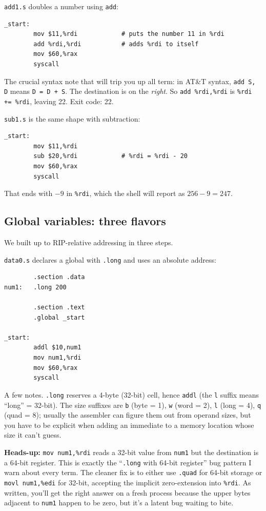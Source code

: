 \documentclass[11pt]{article}
\begin{document}
\texttt{add1.s} doubles a number using \texttt{add}:

\begin{lstlisting}
_start:
        mov $11,%rdi            # puts the number 11 in %rdi
        add %rdi,%rdi           # adds %rdi to itself
        mov $60,%rax
        syscall
\end{lstlisting}

The crucial syntax note that will trip you up all term: in AT\&T
syntax, \texttt{add S, D} means \texttt{D = D + S}. The destination is
on the \emph{right}. So \texttt{add \%rdi,\%rdi} is \texttt{\%rdi +=
\%rdi}, leaving 22. Exit code: 22.

\texttt{sub1.s} is the same shape with subtraction:

\begin{lstlisting}
_start:
        mov $11,%rdi
        sub $20,%rdi            # %rdi = %rdi - 20
        mov $60,%rax
        syscall
\end{lstlisting}

That ends with $-9$ in \texttt{\%rdi}, which the shell will report as
$256 - 9 = 247$.

\subsection*{Global variables: three flavors}

We built up to RIP-relative addressing in three steps.

\texttt{data0.s} declares a global with \texttt{.long} and uses an
absolute address:

\begin{lstlisting}
        .section .data
num1:   .long 200

        .section .text
        .global _start

_start:
        addl $10,num1
        mov num1,%rdi
        mov $60,%rax
        syscall
\end{lstlisting}

A few notes. \texttt{.long} reserves a 4-byte (32-bit) cell, hence
\texttt{addl} (the \texttt{l} suffix means ``long'' = 32-bit). The
size suffixes are \texttt{b} (byte = 1), \texttt{w} (word = 2),
\texttt{l} (long = 4), \texttt{q} (quad = 8); usually the assembler
can figure them out from operand sizes, but you have to be explicit
when adding an immediate to a memory location whose size it can't
guess.

\textbf{Heads-up:} \texttt{mov num1,\%rdi} reads a 32-bit value from
\texttt{num1} but the destination is a 64-bit register. This is
exactly the ``\texttt{.long} with 64-bit register'' bug pattern I
warn about every term. The cleaner fix is to either use \texttt{.quad}
for 64-bit storage or \texttt{movl num1,\%edi} for 32-bit, accepting
the implicit zero-extension into \texttt{\%rdi}. As written, you'll
get the right answer on a fresh process because the upper bytes
adjacent to \texttt{num1} happen to be zero, but it's a latent bug
waiting to bite.
\end{document}
